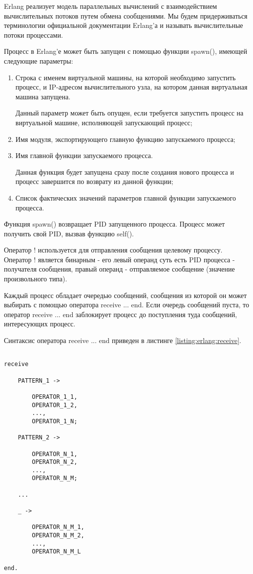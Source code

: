 Erlang реализует модель параллельных вычислений с взаимодействием вычислительных потоков путем обмена сообщениями. Мы будем придерживаться терминологии официальной документации Erlang'а и называть вычислительные потоки процессами.

Процесс в Erlang'е может быть запущен с помощью функции spawn(), имеющей следующие параметры:

\begin{enumerate}

	\item Строка с именем виртуальной машины, на которой необходимо запустить процесс, и IP-адресом вычислительного узла, на котором данная виртуальная машина запущена.

	Данный параметр может быть опущен, если требуется запустить процесс на виртуальной машине, исполняющей запускающий процесс;

	\item Имя модуля, экспортирующего главную функцию запускаемого процесса;

	\item Имя главной функции запускаемого процесса.

	Данная функция будет запущена сразу после создания нового процесса и процесс завершится по возврату из данной функции;

	\item Список фактических значений параметров главной функции запускаемого процесса.

\end{enumerate}

Функция spawn() возвращает PID запущенного процесса. Процесс может получить свой PID, вызвав функцию self().

Оператор ! используется для отправления сообщения целевому процессу. Оператор ! является бинарным - его левый операнд суть есть PID процесса - получателя сообщения, правый операнд - отправляемое сообщение (значение произвольного типа).

Каждый процесс обладает очередью сообщений, сообщения из которой он может выбирать с помощью оператора receive ... end. Если очередь сообщений пуста, то оператор receive ... end заблокирует процесс до поступления туда сообщений, интересующих процесс.

Синтаксис оператора receive ... end приведен в листинге \ref{listing:erlang:receive}.

\begin{lstlisting}

receive

	PATTERN_1 ->

		OPERATOR_1_1,
		OPERATOR_1_2,
		...,
		OPERATOR_1_N;

	PATTERN_2 ->

		OPERATOR_N_1,
		OPERATOR_N_2,
		...,
		OPERATOR_N_M;

	...

	_ ->

		OPERATOR_N_M_1,
		OPERATOR_N_M_2,
		...,
		OPERATOR_N_M_L

end.

\end{lstlisting}
\mylistingend

